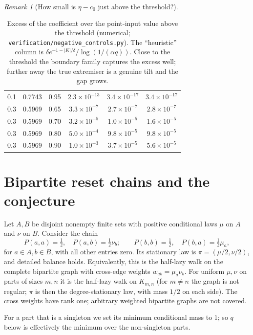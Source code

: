 \documentclass[11pt,a4paper]{article}
\numberwithin{equation}{section}
\theoremstyle{definition}
\theoremstyle{remark}
\newtheorem{remark}[theorem]{Remark}
\begin{document}
\begin{remark}[How small is \(\eta-c_0\) just above the threshold?]
\begin{table}[htbp]
\begin{tabular}{@{}cccccc@{}}
0.1 & 0.7743 & 0.95 & \(2.3\times10^{-13}\) & \(3.4\times10^{-17}\) & \(3.4\times10^{-17}\)\\
0.3 & 0.5969 & 0.65 & \(3.3\times10^{-7}\) & \(2.7\times10^{-7}\) & \(2.8\times10^{-7}\)\\
0.3 & 0.5969 & 0.70 & \(3.2\times10^{-5}\) & \(1.0\times10^{-5}\) & \(1.6\times10^{-5}\)\\
0.3 & 0.5969 & 0.80 & \(5.0\times10^{-4}\) & \(9.8\times10^{-5}\) & \(9.8\times10^{-5}\)\\
0.3 & 0.5969 & 0.90 & \(1.0\times10^{-3}\) & \(3.7\times10^{-5}\) & \(5.6\times10^{-5}\)\\
\bottomrule
\end{tabular}
\caption{Excess of the coefficient over the point-input value above the
threshold (numerical; \texttt{verification/negative\_controls.py}). The
``heuristic'' column is \(\delta e^{-1-|K|/\delta}/\log(1/(\alpha q))\).
Close to the threshold the boundary family captures the excess well;
further away the true extremiser is a genuine tilt and the gap grows.}
\label{tab:excess}
\end{table}
\end{remark}

\section{Bipartite reset chains and the conjecture}\label{sec:bipartite}

Let \(A,B\) be disjoint nonempty finite sets with positive conditional
laws \(\mu\) on \(A\) and \(\nu\) on \(B\). Consider the chain
\begin{equation}\label{eq:weightedP}
P(a,a)=\tfrac12,\quad P(a,b)=\tfrac12\nu_b;\qquad
P(b,b)=\tfrac12,\quad P(b,a)=\tfrac12\mu_a,
\end{equation}
for \(a\in A,b\in B\), with all other entries zero. Its stationary law is
\(\pi=(\mu/2,\nu/2)\), and detailed balance holds. Equivalently, this is the
half-lazy walk on the complete bipartite graph with cross-edge weights
\(w_{ab}=\mu_a\nu_b\). For uniform \(\mu,\nu\) on parts of sizes \(m,n\) it
is the half-lazy walk on \(K_{m,n}\) (for \(m\ne n\) the graph is not
regular; \(\pi\) is then the degree-stationary law, with mass \(1/2\) on
each side). The cross weights have rank one; arbitrary weighted bipartite
graphs are not covered.

For a part that is a singleton we set its minimum conditional mass to \(1\);
so \(q\) below is effectively the minimum over the non-singleton parts.
\end{document}
